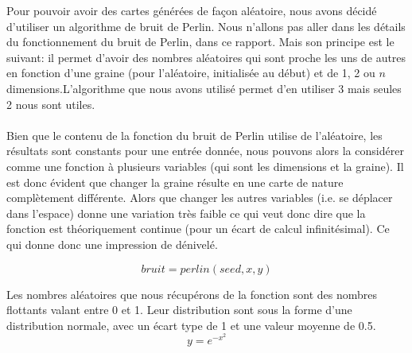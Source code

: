 \documentclass[a4paper,10pt,openany,oneside]{report}
\begin{document}
Pour pouvoir avoir des cartes générées de façon aléatoire, nous avons décidé d'utiliser un algorithme de bruit de Perlin. Nous n'allons pas aller dans les détails du fonctionnement du bruit de Perlin, dans ce rapport. Mais son principe est le suivant: il permet d'avoir des nombres aléatoires qui sont proche les uns de autres en fonction d'une graine (pour l'aléatoire, initialisée au début) et de 1, 2 ou $n$ dimensions.L'algorithme que nous avons utilisé permet d'en utiliser 3 mais seules 2 nous sont utiles.
\paragraph{}
Bien que le contenu de la fonction du bruit de Perlin utilise de l'aléatoire, les résultats sont constants pour une entrée donnée, nous pouvons alors la considérer comme une fonction à plusieurs variables (qui sont les dimensions et la graine).
Il est donc évident que changer la graine résulte en une carte de nature complètement différente.
Alors que changer les autres variables (i.e. se déplacer dans l'espace) donne une variation très faible ce qui veut donc dire que la fonction est théoriquement continue (pour un écart de calcul infinitésimal). Ce qui donne donc une impression de dénivelé.

\[bruit = perlin(seed, x, y)\]

Les nombres aléatoires que nous récupérons de la fonction sont des nombres flottants valant entre 0 et 1.
Leur distribution sont sous la forme d'une distribution normale, avec un écart type de 1 et une valeur moyenne de 0.5.
\[y=e^{-x^{2}}\]
\end{document}
